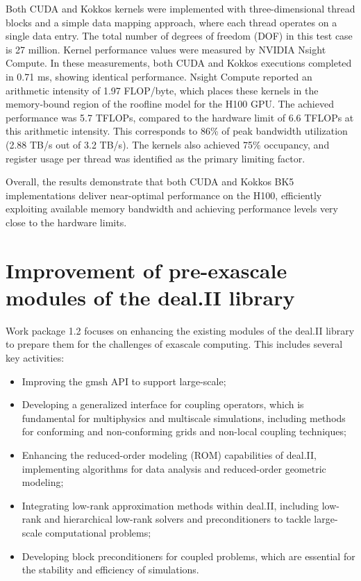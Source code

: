 \documentclass[a4paper,12pt]{article}
\begin{document}
Both CUDA and Kokkos kernels were implemented with three-dimensional thread blocks and a simple data mapping approach, where each thread operates on a single data entry. The total number of degrees of freedom (DOF) in this test case is 27 million. Kernel performance values were measured by NVIDIA Nsight Compute. In these measurements, both CUDA and Kokkos executions completed in 0.71 ms, showing identical performance. Nsight Compute reported an arithmetic intensity of 1.97 FLOP/byte, which places these kernels in the memory-bound region of the roofline model for the H100 GPU. The achieved performance was 5.7 TFLOPs, compared to the hardware limit of 6.6 TFLOPs at this arithmetic intensity. This corresponds to 86\% of peak bandwidth utilization (2.88 TB/s out of 3.2 TB/s). The kernels also achieved 75\% occupancy, and register usage per thread was identified as the primary limiting factor.

Overall, the results demonstrate that both CUDA and Kokkos BK5 implementations deliver near-optimal performance on the H100, efficiently exploiting available memory bandwidth and achieving performance levels very close to the hardware limits.


\section{Improvement of pre-exascale modules of the deal.II library}

Work package 1.2 focuses on enhancing the existing modules of the deal.II
library to prepare them for the challenges of exascale computing. This includes
several key activities: 
\begin{itemize}
    \item Improving the gmsh API to support large-scale;
    \item Developing a generalized interface for coupling operators, which
    is fundamental for multiphysics and multiscale simulations, including methods
    for conforming and non-conforming grids and non-local coupling techniques;
    \item Enhancing the reduced-order modeling (ROM) capabilities of deal.II,
    implementing algorithms for data analysis and reduced-order geometric modeling;
    \item Integrating low-rank approximation methods within deal.II, including
    low-rank and hierarchical low-rank solvers and preconditioners to tackle
    large-scale computational problems;
    \item Developing block preconditioners for coupled problems, which are
    essential for the stability and efficiency of simulations.
\end{itemize}
 
\end{document}
